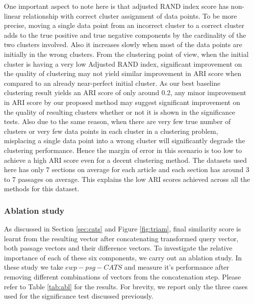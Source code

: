 \documentclass[sigconf,authordraft]{acmart}
\begin{document}
One important aspect to note here is that adjusted RAND index score has non-linear relationship with correct cluster assignment of data points. To be more precise, moving a single data point from an incorrect cluster to a correct cluster adds to the true positive and true negative components by the cardinality of the two clusters involved.  Also it increases slowly when most of the data points are initially in the wrong clusters. From the clustering point of view, when the initial cluster is having a very low Adjusted RAND index, significant improvement on the quality of clustering may not yield similar improvement in ARI score when compared to an already near-perfect initial cluster. As our best baseline clustering result yields an ARI score of only around 0.2, any minor improvement in ARI score by our proposed method may suggest significant improvement on the quality of resulting clusters whether or not it is shown in the significance tests. Also due to the same reason, when there are very few true number of clusters or very few data points in each cluster in a clustering problem, misplacing a single data point into a wrong cluster will significantly degrade the clustering performance. Hence the margin of error in this scenario is too low to achieve a high ARI score even for a decent clustering method. The datasets used here has only 7 sections on average for each article and each section has around 3 to 7 passages on average. This explains the low ARI scores achieved across all the methods for this dataset.

\subsubsection{Ablation study} As discussed in Section \ref{sec:cats} and Figure \ref{fig:triam}, final similarity score is learnt from the resulting vector after concatenating transformed query vector, both passage vectors and their difference vectors. To investigate the relative importance of each of these six components, we carry out an ablation study. In these study we take $ewp-psg-CATS$ and measure it's performance after removing different combinations of vectors from the concatenation step. Please refer to Table \ref{tab:abl} for the results. For brevity, we report only the three cases used for the significance test discussed previously. 
\end{document}
